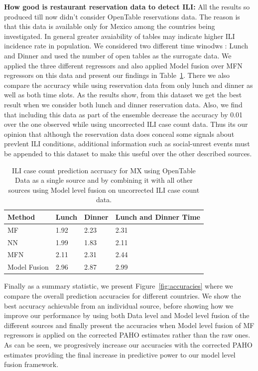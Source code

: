 {\noindent \textbf{How good is restaurant reservation data to detect ILI: }} All the results so produced till now
didn't consider OpenTable reservations data. The reason is that this data is available only for Mexico among the 
countries being investigated. In general greater avaiability of tables may indicate higher ILI incidence rate in population.
We considered two different time winodws : Lunch and Dinner and used the number of open tables as the surrogate data.
We applied the three different regressors and also applied Model fusion over MFN regressors on this data and present 
our findings in Table~\ref{tb:opentable}. There we also compare the accuracy while using reservation 
data from only lunch and dinner as well as both time slots. As the results show, from this dataset we get the best 
result when we consider both lunch and dinner reservation data. Also, we find that including this data as part of the
ensemble decrease the accuracy by 0.01 over the one observed while using uncorrected ILI case count data. Thus its 
our opinion that although the reservation data does conceal some signals about prevlent ILI conditions, additional
information such as social-unrest events must be appended to this dataset to make this useful over the 
other described sources.

\begin{table}[tb!]
\centering
\caption{\label{tb:opentable}  ILI case count prediction accruacy for MX using OpenTable Data as a single source and
by combining it with all other sources using Model level fusion on uncorrected ILI case count data.}
\vspace{1em}
\begin{tabular}{|p{1.5cm}|*{2}{l|}p{2cm}|}
\hline
Method& Lunch & Dinner & Lunch and Dinner Time \\
\hline \hline
MF   & 1.92 & 2.23 & 2.31 \\
NN   & 1.99 & 1.83 & 2.11 \\
MFN  & 2.11 & 2.31 & 2.44 \\
Model Fusion & 2.96 & 2.87 & 2.99 \\
\hline
\end{tabular}
\end{table}

Finally as a summary statistic, we present Figure~\ref{fig:accuracies} where we compare
the overall prediction accuracies for different countries. We show the best
accuracy achievable from an individual source, before showing how we improve our 
performance by using both Data level and Model level fusion of the different sources and finally 
present the accuracies when Model level fusion of MF regressors is applied on the corrected PAHO 
estimates rather than the raw ones. As can be seen, we progresively increase our accuracies
with the corrected PAHO estimates providing the final increase in predictive power to 
our model level fusion framework.

